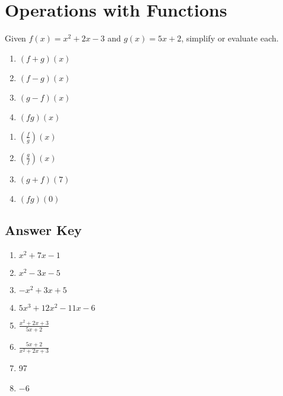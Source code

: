 \chapter{Operations with Functions}

Given $f(x)=x^2 + 2x - 3$ and $g(x) = 5x+2$, simplify or evaluate each.

\begin{multicols}{4}
\begin{enumerate}
	\item $(f+g)(x)$
	\item $(f-g)(x) $
	\item $(g-f)(x)$
	\item $(fg)(x)$
\end{enumerate}	\setcounter{Review}{\value{enumi}}
\end{multicols}
\begin{multicols}{4}
\begin{enumerate}	\setcounter{enumi}{\value{Review}}
	\item $\left(\frac{f}{g}\right)(x)$
	\item $\left(\frac{g}{f}\right)(x) $
	\item $(g+f)(7)$
	\item $(fg)(0)$
\end{enumerate}	\setcounter{Review}{\value{enumi}}
\end{multicols}

\newpage

\section{Answer Key}

\begin{enumerate}
	\item $x^2+7x-1$
    \item $x^2-3x-5$
    \item $-x^2+3x+5$
    \item $5x^3+12x^2-11x-6$
    \item $\frac{x^2+2x+3}{5x+2}$
    \item $\frac{5x+2}{x^2+2x+3}$
    \item 97
    \item $-6$
\end{enumerate}